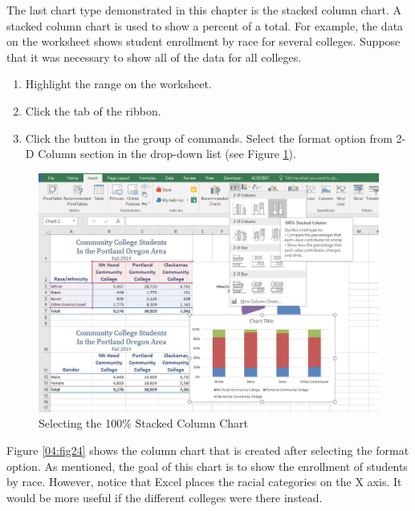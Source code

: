 The last chart type demonstrated in this chapter is the stacked column chart. A stacked column chart is used  to show a percent of a total. For example, the data on the  worksheet shows student enrollment by race for several colleges. Suppose that it was necessary to show all of the data for all colleges.

\begin{enumerate}
	\item Highlight the range  on the  worksheet.
	\item Click the  tab of the ribbon.
	\item Click the  button in the  group of commands. Select the  format option from 2-D Column section in the drop-down list (see Figure \ref{04:fig23}).
\end{enumerate}

\begin{figure}[H]
	\centering
	\includegraphics[width=\maxwidth{.95\linewidth}]{gfx/ch04_fig23}
	\caption{Selecting the 100\% Stacked Column Chart}
	\label{04:fig23}
\end{figure}

Figure \ref{04:fig24} shows the column chart that is created after selecting the  format option. As mentioned, the goal of this chart is to show the enrollment of students by race. However, notice that Excel places the racial categories on the X axis. It would be more useful if the different colleges were there instead.

